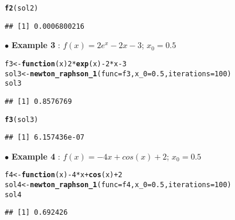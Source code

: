 \documentclass[11pt, a4paper]{article}\usepackage[]{graphicx}\usepackage[]{xcolor}
\makeatletter
\newcommand{\hlnum}[1]{\textcolor[rgb]{0.686,0.059,0.569}{#1}}%
\newcommand{\hlopt}[1]{\textcolor[rgb]{0,0,0}{#1}}%
\newcommand{\hldef}[1]{\textcolor[rgb]{0.345,0.345,0.345}{#1}}%
\newcommand{\hlkwa}[1]{\textcolor[rgb]{0.161,0.373,0.58}{\textbf{#1}}}%
\newcommand{\hlkwb}[1]{\textcolor[rgb]{0.69,0.353,0.396}{#1}}%
\newcommand{\hlkwc}[1]{\textcolor[rgb]{0.333,0.667,0.333}{#1}}%
\newcommand{\hlkwd}[1]{\textcolor[rgb]{0.737,0.353,0.396}{\textbf{#1}}}%
\newenvironment{kframe}{%
 \def\at@end@of@kframe{}%
 \ifinner\ifhmode%
  \def\at@end@of@kframe{\end{minipage}}%
  \begin{minipage}{\columnwidth}%
 \fi\fi%
 \def\FrameCommand##1{\hskip\@totalleftmargin \hskip-\fboxsep
 \colorbox{shadecolor}{##1}\hskip-\fboxsep
     \hskip-\linewidth \hskip-\@totalleftmargin \hskip\columnwidth}%
 \MakeFramed {\advance\hsize-\width
   \@totalleftmargin\z@ \linewidth\hsize
   \@setminipage}}%
 {\par\unskip\endMakeFramed%
 \at@end@of@kframe}
\newenvironment{knitrout}{}{} %
\makeatother
\begin{document}
\begin{knitrout}
\color{fgcolor}\begin{kframe}
\begin{alltt}
\hlkwd{f2}\hldef{(sol2)}
\end{alltt}
\begin{verbatim}
## [1] 0.0006800216
\end{verbatim}
\end{kframe}
\end{knitrout}

$\bullet$ \textbf{Example 3} : $f(x) = 2e^x - 2x - 3$; $x_0 = 0.5$

\begin{knitrout}
\color{fgcolor}\begin{kframe}
\begin{alltt}
\hldef{f3} \hlkwb{<-} \hlkwa{function}\hldef{(}\hlkwc{x}\hldef{)} \hlnum{2} \hlopt{*} \hlkwd{exp}\hldef{(x)} \hlopt{-} \hlnum{2}\hlopt{*}\hldef{x} \hlopt{-} \hlnum{3}
\hldef{sol3} \hlkwb{<-} \hlkwd{newton_raphson_1}\hldef{(}\hlkwc{func} \hldef{= f3,} \hlkwc{x_0} \hldef{=} \hlnum{0.5}\hldef{,} \hlkwc{iterations} \hldef{=} \hlnum{100}\hldef{)}
\hldef{sol3}
\end{alltt}
\begin{verbatim}
## [1] 0.8576769
\end{verbatim}
\end{kframe}
\end{knitrout}

\begin{knitrout}
\color{fgcolor}\begin{kframe}
\begin{alltt}
\hlkwd{f3}\hldef{(sol3)}
\end{alltt}
\begin{verbatim}
## [1] 6.157436e-07
\end{verbatim}
\end{kframe}
\end{knitrout}

$\bullet$ \textbf{Example 4} : $f(x) = - 4x + cos(x) + 2$; $x_0 = 0.5$

\begin{knitrout}
\color{fgcolor}\begin{kframe}
\begin{alltt}
\hldef{f4} \hlkwb{<-} \hlkwa{function}\hldef{(}\hlkwc{x}\hldef{)} \hlopt{-}\hlnum{4} \hlopt{*} \hldef{x} \hlopt{+} \hlkwd{cos}\hldef{(x)} \hlopt{+} \hlnum{2}
\hldef{sol4} \hlkwb{<-} \hlkwd{newton_raphson_1}\hldef{(}\hlkwc{func} \hldef{= f4,} \hlkwc{x_0} \hldef{=} \hlnum{0.5}\hldef{,} \hlkwc{iterations} \hldef{=} \hlnum{100}\hldef{)}
\hldef{sol4}
\end{alltt}
\begin{verbatim}
## [1] 0.692426
\end{verbatim}
\end{kframe}
\end{knitrout}
\end{document}
